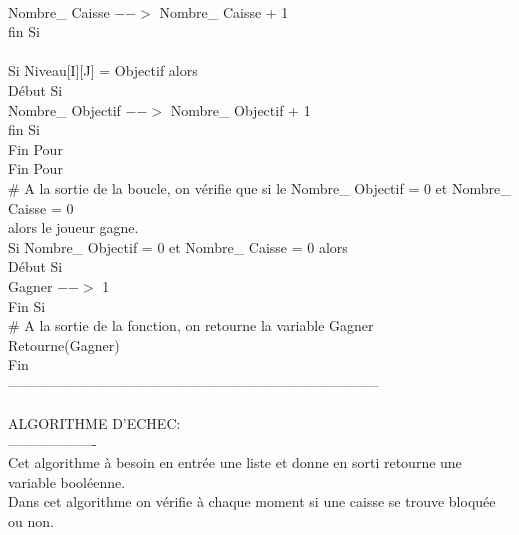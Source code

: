 \documentclass{article}
\begin{document}
\begin{tabbing}
\\	\hspace{4cm}			Nombre\_ Caisse $-->$ Nombre\_ Caisse + 1
\\	\hspace{3cm}		fin Si
\\			
\\	\hspace{3cm}		Si Niveau[I][J] = Objectif alors
\\	\hspace{3cm}		Début Si
\\	\hspace{4cm}		Nombre\_ Objectif $-->$ Nombre\_ Objectif + 1
\\	\hspace{3cm}		fin Si
\\	\hspace{2cm}	Fin Pour 
\\	\hspace{1cm} Fin Pour 
\\	\hspace{1cm} \# A la sortie de la boucle, on vérifie que si le Nombre\_ Objectif = 0 et Nombre\_ Caisse = 0
\\ \hspace{1cm} alors le joueur gagne.
\\	\hspace{1cm} Si Nombre\_ Objectif = 0 et Nombre\_ Caisse = 0 alors
\\	\hspace{1cm} Début Si
\\	\hspace{2cm}	Gagner $-->$ 1
\\	\hspace{1cm} Fin Si
\\	\hspace{1cm} \# A la sortie de la fonction, on retourne la variable Gagner
\\	\hspace{1cm} Retourne(Gagner)
\\Fin
\\--------------------------------------------------------------------------------
\\
\\ALGORITHME D'ECHEC:
\\-------------------
\\Cet algorithme à besoin en entrée une liste et donne en sorti retourne une variable booléenne.
\\Dans cet algorithme on vérifie à chaque moment si une caisse se trouve bloquée ou non.

\end{tabbing}
\end{document}
